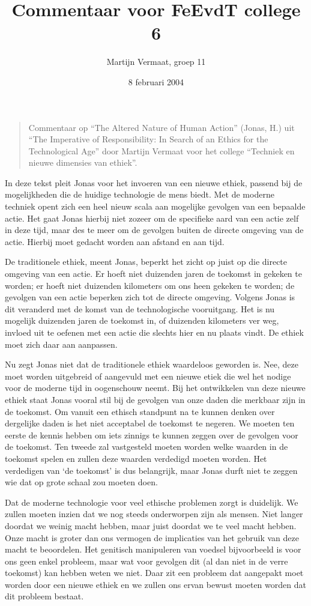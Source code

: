 \documentclass[11pt]{article}
\title{Commentaar voor FeEvdT college 6}
\author{
    Martijn Vermaat, groep 11
}
\date{8 februari 2004}
\begin{document}
\maketitle

\begin{quote}
Commentaar op ``The Altered Nature of Human Action'' (Jonas, H.) uit ``The Imperative of Responsibility: In Search of an Ethics for the Technological Age'' door Martijn Vermaat voor het college ``Techniek en nieuwe dimensies van ethiek''.
\end{quote}


In deze tekst pleit Jonas voor het invoeren van een nieuwe ethiek, passend bij de mogelijkheden die de huidige technologie de mens biedt. Met de moderne techniek opent zich een heel nieuw scala aan mogelijke gevolgen van een bepaalde actie. Het gaat Jonas hierbij niet zozeer om de specifieke aard van een actie zelf in deze tijd, maar des te meer om de gevolgen buiten de directe omgeving van de actie. Hierbij moet gedacht worden aan afstand en aan tijd.

De traditionele ethiek, meent Jonas, beperkt het zicht op juist op die directe omgeving van een actie. Er hoeft niet duizenden jaren de toekomst in gekeken te worden; er hoeft niet duizenden kilometers om ons heen gekeken te worden; de gevolgen van een actie beperken zich tot de directe omgeving. Volgens Jonas is dit veranderd met de komst van de technologische vooruitgang. Het is nu mogelijk duizenden jaren de toekomst in, of duizenden kilometers ver weg, invloed uit te oefenen met een actie die slechts hier en nu plaats vindt. De ethiek moet zich daar aan aanpassen.

Nu zegt Jonas niet dat de traditionele ethiek waardeloos geworden is. Nee, deze moet worden uitgebreid of aangevuld met een nieuwe etiek die wel het nodige voor de moderne tijd in oogenschouw neemt. Bij het ontwikkelen van deze nieuwe ethiek staat Jonas vooral stil bij de gevolgen van onze daden die merkbaar zijn in de toekomst. Om vanuit een ethisch standpunt na te kunnen denken over dergelijke daden is het niet acceptabel de toekomst te negeren. We moeten ten eerste de kennis hebben om iets zinnigs te kunnen zeggen over de gevolgen voor de toekomst. Ten tweede zal vastgesteld moeten worden welke waarden in de toekomst spelen en zullen deze waarden verdedigd moeten worden. Het verdedigen van `de toekomst' is dus belangrijk, maar Jonas durft niet te zeggen wie dat op grote schaal zou moeten doen.

Dat de moderne technologie voor veel ethische problemen zorgt is duidelijk. We zullen moeten inzien dat we nog steeds onderworpen zijn als mensen. Niet langer doordat we weinig macht hebben, maar juist doordat we te veel macht hebben. Onze macht is groter dan ons vermogen de implicaties van het gebruik van deze macht te beoordelen. Het genitisch manipuleren van voedsel bijvoorbeeld is voor ons geen enkel probleem, maar wat voor gevolgen dit (al dan niet in de verre toekomst) kan hebben weten we niet. Daar zit een probleem dat aangepakt moet worden door een nieuwe ethiek en we zullen ons ervan bewust moeten worden dat dit probleem bestaat.
\end{document}
